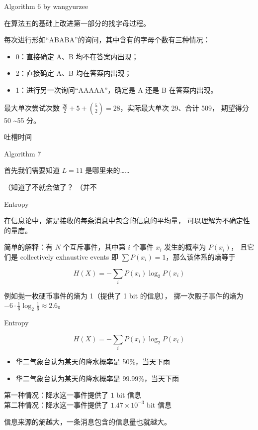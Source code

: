 \documentclass[UTF8]{beamer}
\begin{document}
\begin{frame}{Algorithm 6 by wangyurzee}

在算法五的基础上改进第一部分的找字母过程。

\pause 每次进行形如“ABABA”的询问，其中含有的字母个数有三种情况：
\begin{itemize}
    \item 0：直接确定 A、B 均不在答案内出现；
    \item 2：直接确定 A、B 均在答案内出现；
    \item 1：进行另一次询问“AAAAA”，确定是 A 还是 B 在答案内出现。
\end{itemize} 

\pause 最大单次尝试次数 $\frac{26}{2} + 5 + \binom{5}{2} = 28$，实际最大单次 29、合计 509，
期望得分 50 \textasciitilde 55 分。

\end{frame}

\begin{frame}{吐槽时间}
\end{frame}

\begin{frame}{Algorithm 7}

首先我们需要知道 $L = 11$ 是哪里来的……

\pause （知道了不就会做了？
\pause （并不

\end{frame}

\begin{frame}{Entropy}


在信息论中，熵是接收的每条消息中包含的信息的平均量，%
可以理解为不确定性的量度。

简单的解释：有 $N$ 个互斥事件，其中第 $i$ 个事件 $x_i$ 发生的概率为 $P(x_i)$，
且它们是 collectively exhaustive events 即 $\sum P(x_i) = 1$，那么该体系的熵等于

$$
    H(X) = -\sum_{i} P(x_i) \log_2 P(x_i)
$$

例如抛一枚硬币事件的熵为 1（提供了 1 bit 的信息），%
掷一次骰子事件的熵为 $-6 \cdot \frac{1}{6} \log_2 \frac{1}{6} \approx 2.6$。

\end{frame}

\begin{frame}{Entropy}

$$
    H(X) = -\sum_{i} P(x_i) \log_2 P(x_i)
$$

\begin{itemize}
    \item {}华二气象台认为某天的降水概率是 50\%，当天下雨
    \item {}华二气象台认为某天的降水概率是 99.99\%，当天下雨
\end{itemize}

\pause
第一种情况：降水这一事件提供了 $1$ bit 信息\\
第二种情况：降水这一事件提供了 $1.47 \times 10^{-3}$ bit 信息 \newline\newline

信息来源的熵越大，一条消息包含的信息量也就越大。

\end{frame}
\end{document}
